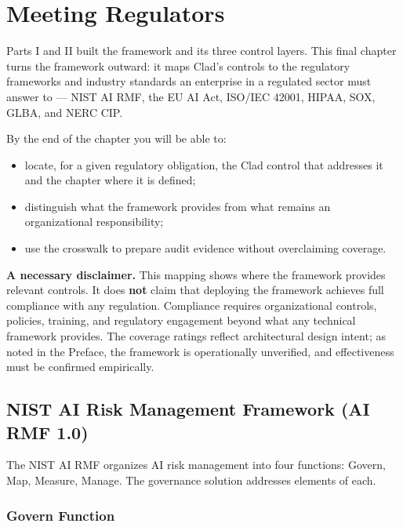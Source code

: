 \chapter{Meeting Regulators}
\label{ch:regmap}


Parts I and II built the framework and its three control layers. This final chapter turns the framework outward: it maps Clad's controls to the regulatory frameworks and industry standards an enterprise in a regulated sector must answer to --- NIST AI RMF, the EU AI Act, ISO/IEC 42001, HIPAA, SOX, GLBA, and NERC CIP.

By the end of the chapter you will be able to:

\begin{itemize}
  \item locate, for a given regulatory obligation, the Clad control that addresses it and the chapter where it is defined;
  \item distinguish what the framework provides from what remains an organizational responsibility;
  \item use the crosswalk to prepare audit evidence without overclaiming coverage.
\end{itemize}


\textbf{A necessary disclaimer.} This mapping shows where the framework provides relevant controls. It does \textbf{not} claim that deploying the framework achieves full compliance with any regulation. Compliance requires organizational controls, policies, training, and regulatory engagement beyond what any technical framework provides. The coverage ratings reflect architectural design intent; as noted in the Preface, the framework is operationally unverified, and effectiveness must be confirmed empirically.



\section{NIST AI Risk Management Framework (AI RMF 1.0)}
\label{sec:regmap-1}


The NIST AI RMF organizes AI risk management into four functions: Govern, Map, Measure, Manage. The governance solution addresses elements of each.

\subsection{Govern Function}


